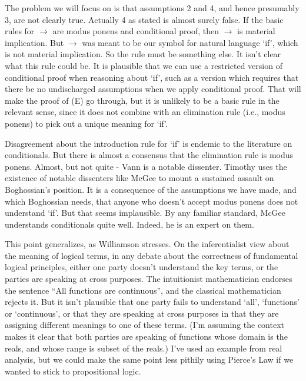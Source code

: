 The problem we will focus on is that assumptions 2 and 4, and hence presumably 3, are not clearly true. Actually 4 as stated is almost surely false. If the basic rules for $\rightarrow$ are modus ponens and conditional proof, then $\rightarrow$ is material implication. But $\rightarrow$ was meant to be our symbol for natural language `if', which is not material implication. So the rule must be something else. It isn't clear what this rule could be. It is plausible that we can use a restricted version of conditional proof when reasoning about `if', such as a version which requires that there be no undischarged assumptions when we apply conditional proof. That will make the proof of (E) go through, but it is unlikely to be a basic rule in the relevant sense, since it does not combine with an elimination rule (i.e., modus ponens) to pick out a unique meaning for `if'.

Disagreement about the introduction rule for `if' is endemic to the literature on conditionals. But there is almost a consensus that the elimination rule is modus ponens. Almost, but not quite - Vann  \citet{McGee1985} is a notable dissenter. Timothy  \citet[Ch. 4]{Williamson2007-WILTPO-17} uses the existence of notable dissenters like McGee to mount a sustained assault on Boghossian's position. It is a consequence of the assumptions we have made, and which Boghossian needs, that anyone who doesn't accept modus ponens does not understand `if'. But that seems implausible. By any familiar standard, McGee understands conditionals quite well. Indeed, he is an expert on them.

This point generalizes, as Williamson stresses. On the inferentialist view about the meaning of logical terms, in any debate about the correctness of fundamental logical principles, either one party doesn't understand the key terms, or the parties are speaking at cross purposes. The intuitionist mathematician endorses the sentence ``All functions are continuous'', and the classical mathematician rejects it. But it isn't plausible that one party fails to understand `all', `functions' or `continuous', or that they are speaking at cross purposes in that they are assigning different meanings to one of these terms. (I'm assuming the context makes it clear that both parties are speaking of functions whose domain is the reals, and whose range is subset of the reals.) I've used an example from real analysis, but we could make the same point less pithily using Pierce's Law if we wanted to stick to propositional logic.

